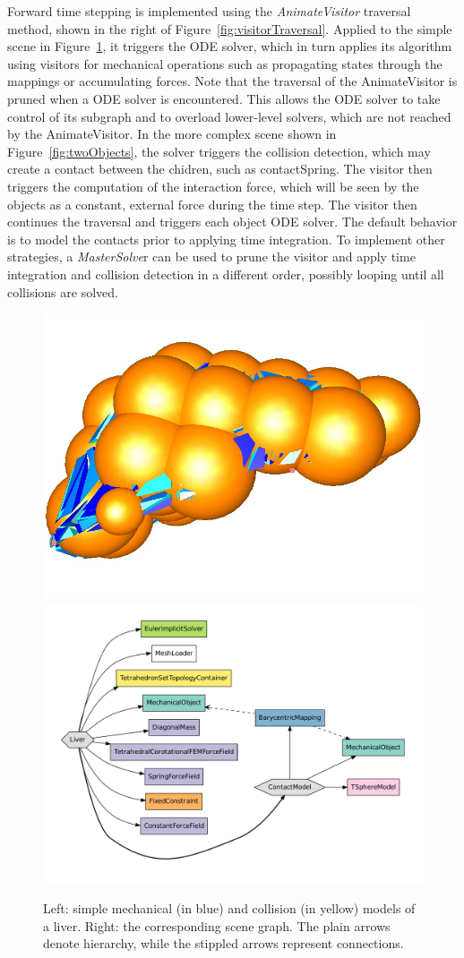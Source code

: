 Forward time stepping is implemented using the \textit{AnimateVisitor} traversal method, shown in the right of Figure~\ref{fig:visitorTraversal}.
Applied to the simple scene in Figure~\ref{fig:liver-mechanical-spheres}, it triggers the ODE solver, which in turn applies its algorithm using visitors for mechanical operations such as propagating states through the mappings or accumulating forces.
Note that the traversal of the AnimateVisitor is pruned when a ODE solver is encountered.
This allows the ODE solver to take control of its subgraph and to overload lower-level solvers, which are not reached by the AnimateVisitor.
In the more complex scene shown in Figure~\ref{fig:twoObjects}, the solver triggers the collision detection, which may create a contact between the chidren, such as contactSpring.
The visitor then triggers the computation of the interaction force, which will be seen by the objects as a constant, external force during the time step.
The visitor then continues the traversal and triggers each object ODE solver.
The default behavior is to model the contacts prior to applying time integration.
To implement other strategies, a \textit{MasterSolve}r can be used to prune the visitor and apply time integration and collision detection in a different order, possibly looping until all collisions are solved.

\begin{figure}
 \centering
 \includegraphics[width=0.4\linewidth]{liver-spheres-superimposed.jpg}
 \includegraphics[width=0.56\linewidth]{liver-spheres.pdf}   %
 \caption{Left: simple mechanical (in blue) and collision (in yellow) models of a liver. Right: the corresponding scene graph. The plain arrows denote hierarchy, while the stippled arrows represent connections.}
 \label{fig:liver-mechanical-spheres}
\end{figure}

